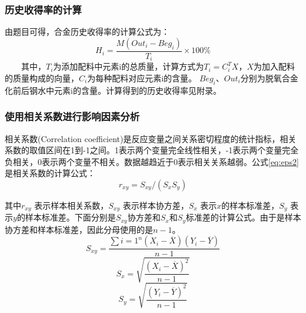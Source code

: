 \documentclass{xcumcmart}
\begin{document}
\subsubsection{历史收得率的计算}
由题目可得，合金历史收得率的计算公式为：
\begin{equation} \label{eq:eps1}
    H_i=\frac{M(Out_i-Beg_i)}{T_i}\times 100\%
\end{equation}
　　其中，$T_i$为添加配料中元素i的总质量，计算方式为$T_i=C_{i}^{T}X$，$X$为加入配料的质量构成的向量，$C_i$为每种配料对应元素i的含量。
$Beg_i$、$Out_i$分别为脱氧合金化前后钢水中元素i的含量。计算得到的历史收得率见附录。

\subsubsection{使用相关系数进行影响因素分析}
相关系数(Correlation coefficient)是反应变量之间关系密切程度的统计指标，相关系数的取值区间在1到-1之间。1表示两个变量完全线性相关，-1表示两个变量完全负相关，0表示两个变量不相关。数据越趋近于0表示相关关系越弱。公式\ref{eq:eps2}是相关系数的计算公式：
\begin{equation} \label{eq:eps2}
    r_{xy}=S_{xy}/(S_xS_y )
\end{equation}

其中$r_{xy}$ 表示样本相关系数，$S_{xy}$ 表示样本协方差，$S_x$ 表示$x$的样本标准差，$S_y$  表示$y$的样本标准差。下面分别是$S_{xy}$协方差和$S_x$和$S_y$标准差的计算公式。由于是样本协方差和样本标准差，因此分母使用的是$n-1$。
\[S_{xy}=\frac{\sum{i=1}^n(X_i-\overline{X})(Y_i-\overline{Y})}{n-1}\]
\[S_x=\sqrt{\frac{(X_i-\overline{X})^2}{n-1}}\]
\[S_y=\sqrt{\frac{(Y_i-\overline{Y})^2}{n-1}}\]
\end{document}
